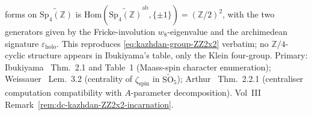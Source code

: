 \begin{remark}[Group-structure determination: $S_{\psi_{\Delta_5}} = (\mathbb{Z}/2)^2$ versus $\mathbb{Z}/4$]
forms on $\widetilde{\mathrm{Sp}_4(\mathbb{Z})}$ is
$\mathrm{Hom}(\widetilde{\mathrm{Sp}_4(\mathbb{Z})}^{\mathrm{ab}},
\{\pm 1\}) = (\mathbb{Z}/2)^2$, with the two generators given by the
Fricke-involution $w_8$-eigenvalue and the archimedean signature
$\varepsilon_{\mathrm{holo}}$. This reproduces
\eqref{eq:kazhdan-group-ZZ2x2} verbatim; no $\mathbb{Z}/4$-cyclic
structure appears in Ibukiyama's table, only the Klein four-group. Primary:
Ibukiyama~\cite{Ibukiyama1998Paramodular} Thm.\ 2.1 and Table~1
(Maass-spin character enumeration);
Weissauer~\cite{Weissauer2009GSp4} Lem.\ 3.2 (centrality of
$\zeta_{\mathrm{spin}}$ in $\widetilde{\mathrm{SO}_5}$);
Arthur~\cite{Arthur2013Endoscopic} Thm.\ 2.2.1 (centraliser
computation compatibility with $A$-parameter decomposition).
Vol~III Remark~\ref{rem:dc-kazhdan-ZZ2x2-incarnation}.
\end{remark}

